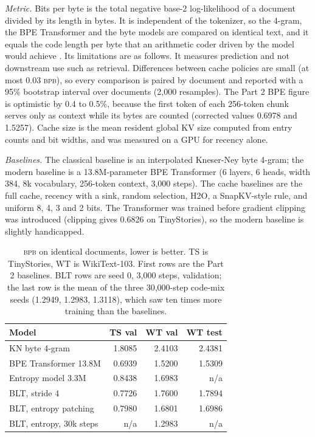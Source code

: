 \documentclass[10pt,twocolumn]{extarticle}
\newcommand{\bpb}{\textsc{bpb}}
\begin{document}
\textit{Metric.} Bits per byte is the total negative base-2 log-likelihood of a document divided by its length in bytes. It is independent of the tokenizer, so the 4-gram, the BPE Transformer and the byte models are compared on identical text, and it equals the code length per byte that an arithmetic coder driven by the model would achieve \citep{deletang2023compression}. Its limitations are as follows. It measures prediction and not downstream use such as retrieval. Differences between cache policies are small (at most 0.03 \bpb), so every comparison is paired by document and reported with a 95\% bootstrap interval over documents (2,000 resamples). The Part 2 BPE figure is optimistic by 0.4 to 0.5\%, because the first token of each 256-token chunk serves only as context while its bytes are counted (corrected values 0.6978 and 1.5257). Cache size is the mean resident global KV size computed from entry counts and bit widths, and was measured on a GPU for recency alone.

\textit{Baselines.} The classical baseline is an interpolated Kneser-Ney byte 4-gram; the modern baseline is a 13.8M-parameter BPE Transformer (6 layers, 6 heads, width 384, 8k vocabulary, 256-token context, 3,000 steps). The cache baselines are the full cache, recency with a sink, random selection, H2O, a SnapKV-style rule, and uniform 8, 4, 3 and 2 bits. The Transformer was trained before gradient clipping was introduced (clipping gives 0.6826 on TinyStories), so the modern baseline is slightly handicapped.

\begin{table}[t]
\centering\footnotesize
\caption{\bpb{} on identical documents, lower is better. TS is TinyStories, WT is WikiText-103. First rows are the Part 2 baselines. BLT rows are seed 0, 3,000 steps, validation; the last row is the mean of the three 30,000-step code-mix seeds (1.2949, 1.2983, 1.3118), which saw ten times more training than the baselines.}\label{tab:base}
\begin{tabular}{@{}lrrr@{}}
\toprule
Model & TS val & WT val & WT test\\
\midrule
KN byte 4-gram & 1.8085 & 2.4103 & 2.4381\\
BPE Transformer 13.8M & 0.6939 & 1.5200 & 1.5309\\
Entropy model 3.3M & 0.8438 & 1.6983 & n/a\\
BLT, stride 4 & 0.7726 & 1.7600 & 1.7894\\
BLT, entropy patching & 0.7980 & 1.6801 & 1.6986\\
BLT, entropy, 30k steps & n/a & 1.2983 & n/a\\
\bottomrule
\end{tabular}
\end{table}
\end{document}
